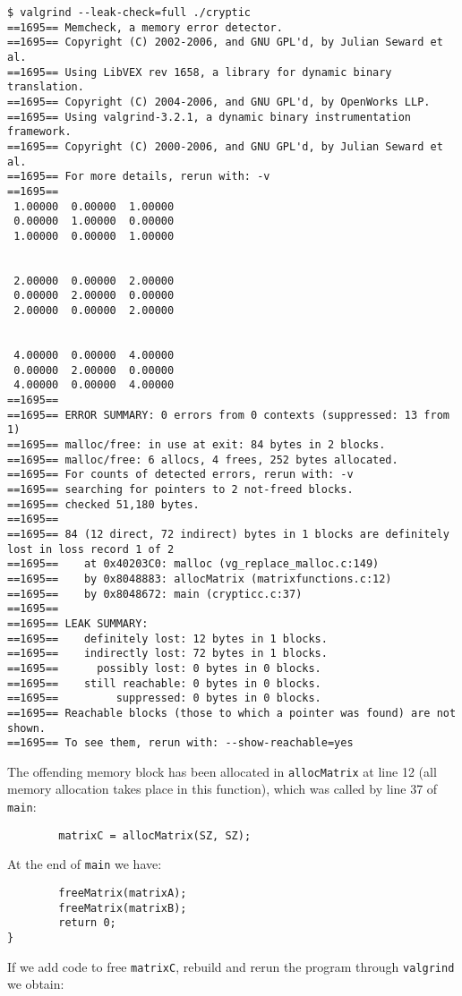 \documentclass[a4paper,12pt]{article}
\begin{document}
\begin{verbatim}
$ valgrind --leak-check=full ./cryptic
==1695== Memcheck, a memory error detector.
==1695== Copyright (C) 2002-2006, and GNU GPL'd, by Julian Seward et al.
==1695== Using LibVEX rev 1658, a library for dynamic binary translation.
==1695== Copyright (C) 2004-2006, and GNU GPL'd, by OpenWorks LLP.
==1695== Using valgrind-3.2.1, a dynamic binary instrumentation framework.
==1695== Copyright (C) 2000-2006, and GNU GPL'd, by Julian Seward et al.
==1695== For more details, rerun with: -v
==1695== 
 1.00000  0.00000  1.00000 
 0.00000  1.00000  0.00000 
 1.00000  0.00000  1.00000 


 2.00000  0.00000  2.00000 
 0.00000  2.00000  0.00000 
 2.00000  0.00000  2.00000 


 4.00000  0.00000  4.00000 
 0.00000  2.00000  0.00000 
 4.00000  0.00000  4.00000 
==1695== 
==1695== ERROR SUMMARY: 0 errors from 0 contexts (suppressed: 13 from 1)
==1695== malloc/free: in use at exit: 84 bytes in 2 blocks.
==1695== malloc/free: 6 allocs, 4 frees, 252 bytes allocated.
==1695== For counts of detected errors, rerun with: -v
==1695== searching for pointers to 2 not-freed blocks.
==1695== checked 51,180 bytes.
==1695== 
==1695== 84 (12 direct, 72 indirect) bytes in 1 blocks are definitely lost in loss record 1 of 2
==1695==    at 0x40203C0: malloc (vg_replace_malloc.c:149)
==1695==    by 0x8048883: allocMatrix (matrixfunctions.c:12)
==1695==    by 0x8048672: main (crypticc.c:37)
==1695== 
==1695== LEAK SUMMARY:
==1695==    definitely lost: 12 bytes in 1 blocks.
==1695==    indirectly lost: 72 bytes in 1 blocks.
==1695==      possibly lost: 0 bytes in 0 blocks.
==1695==    still reachable: 0 bytes in 0 blocks.
==1695==         suppressed: 0 bytes in 0 blocks.
==1695== Reachable blocks (those to which a pointer was found) are not shown.
==1695== To see them, rerun with: --show-reachable=yes
\end{verbatim}
The offending memory block has been allocated in \verb|allocMatrix| at line 12 (all memory allocation takes place in this function), which was called by line 37 of {\tt main}:
\begin{verbatim}
        matrixC = allocMatrix(SZ, SZ);
\end{verbatim}
At the end of {\tt main} we have:
\begin{verbatim}
        freeMatrix(matrixA);
        freeMatrix(matrixB);
        return 0;
}
\end{verbatim}
If we add code to free {\tt matrixC}, rebuild and rerun the program through {\tt valgrind} we obtain:
\end{document}
